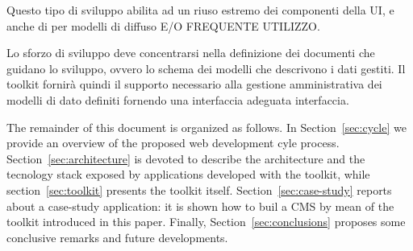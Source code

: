 Questo tipo di sviluppo abilita ad un riuso estremo dei componenti della UI, e anche di per modelli di diffuso E/O FREQUENTE UTILIZZO.

Lo sforzo di sviluppo deve concentrarsi nella definizione dei documenti che guidano lo sviluppo, ovvero lo schema dei modelli che descrivono i dati gestiti. Il toolkit fornirà quindi il supporto necessario alla gestione amministrativa dei modelli di dato definiti fornendo una interfaccia adeguata interfaccia. 


The remainder of this document is organized as follows. In
Section~\ref{sec:cycle} we provide an overview of the proposed web development cyle process. Section~\ref{sec:architecture} is devoted to describe the architecture and the tecnology stack exposed by applications developed with the toolkit, while section~\ref{sec:toolkit} presents the toolkit itself. Section~\ref{sec:case-study} reports about a case-study application: it is shown how to buil a CMS by mean of the toolkit introduced in this paper. Finally, Section~\ref{sec:conclusions} proposes some conclusive remarks and future developments.

